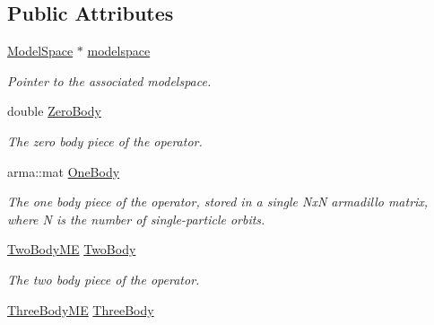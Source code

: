 \subsection*{Public Attributes}
\begin{DoxyCompactItemize}
\item 
\hyperlink{classModelSpace}{Model\+Space} $\ast$ \hyperlink{classOperator_af08ef1c6d3ef38d08b4a6ea20b26ef22}{modelspace}\hypertarget{classOperator_af08ef1c6d3ef38d08b4a6ea20b26ef22}{}\label{classOperator_af08ef1c6d3ef38d08b4a6ea20b26ef22}

\begin{DoxyCompactList}\small\item\em Pointer to the associated modelspace. \end{DoxyCompactList}\item 
double \hyperlink{classOperator_a2f9f1109333a2485083cc7c090f9cd26}{Zero\+Body}\hypertarget{classOperator_a2f9f1109333a2485083cc7c090f9cd26}{}\label{classOperator_a2f9f1109333a2485083cc7c090f9cd26}

\begin{DoxyCompactList}\small\item\em The zero body piece of the operator. \end{DoxyCompactList}\item 
arma\+::mat \hyperlink{classOperator_a14b1c78e0be45772aa57168c74d1b57c}{One\+Body}\hypertarget{classOperator_a14b1c78e0be45772aa57168c74d1b57c}{}\label{classOperator_a14b1c78e0be45772aa57168c74d1b57c}

\begin{DoxyCompactList}\small\item\em The one body piece of the operator, stored in a single NxN armadillo matrix, where N is the number of single-\/particle orbits. \end{DoxyCompactList}\item 
\hyperlink{classTwoBodyME}{Two\+Body\+ME} \hyperlink{classOperator_add51ac69970faff9936192fec4181e00}{Two\+Body}\hypertarget{classOperator_add51ac69970faff9936192fec4181e00}{}\label{classOperator_add51ac69970faff9936192fec4181e00}

\begin{DoxyCompactList}\small\item\em The two body piece of the operator. \end{DoxyCompactList}\item 
\hyperlink{classThreeBodyME}{Three\+Body\+ME} \hyperlink{classOperator_ac9d7e28ec1958d5065e12cbf0c0e3541}{Three\+Body}\hypertarget{classOperator_ac9d7e28ec1958d5065e12cbf0c0e3541}{}\label{classOperator_ac9d7e28ec1958d5065e12cbf0c0e3541}


\end{DoxyCompactItemize}
